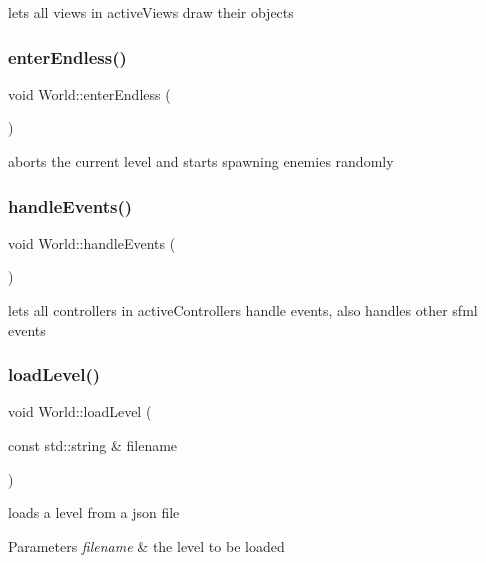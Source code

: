 lets all views in active\+Views draw their objects \mbox{\label{classWorld_a04f39f13be0b568122bc8a539c15f014}} 
\subsubsection{\texorpdfstring{enter\+Endless()}{enterEndless()}}
{\footnotesize\ttfamily void World\+::enter\+Endless (\begin{DoxyParamCaption}{ }\end{DoxyParamCaption})}

aborts the current level and starts spawning enemies randomly \mbox{\label{classWorld_ad37fe32cce284282361b9e7397b27a23}} 
\subsubsection{\texorpdfstring{handle\+Events()}{handleEvents()}}
{\footnotesize\ttfamily void World\+::handle\+Events (\begin{DoxyParamCaption}{ }\end{DoxyParamCaption})}

lets all controllers in active\+Controllers handle events, also handles other sfml events \mbox{\label{classWorld_a6a08c827c3a0def12b7700211353735f}} 
\subsubsection{\texorpdfstring{load\+Level()}{loadLevel()}}
{\footnotesize\ttfamily void World\+::load\+Level (\begin{DoxyParamCaption}\item[{const std\+::string \&}]{filename }\end{DoxyParamCaption})}

loads a level from a json file 
\begin{DoxyParams}{Parameters}
{\em filename} & the level to be loaded \\
\hline
\end{DoxyParams}
\mbox{\label{classWorld_a91c2d7b127190f17a6cd85743245fb5b}} 
